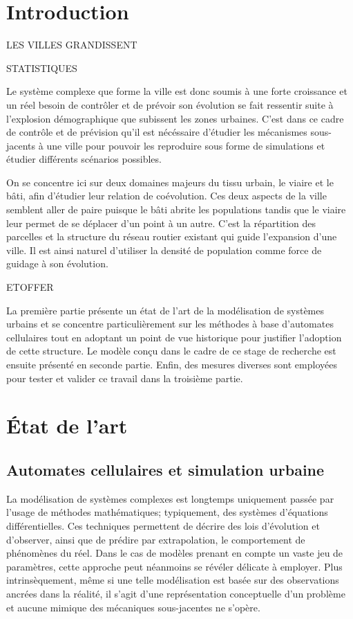 \documentclass[12pt]{article}
\begin{document}
\newpage

\section{Introduction}

LES VILLES GRANDISSENT

STATISTIQUES

Le système complexe que forme la ville est donc soumis à une forte
croissance et un réel besoin de contrôler et de prévoir son évolution
se fait ressentir suite à l'explosion démographique que subissent les
zones urbaines. C'est dans ce cadre de contrôle et de prévision qu'il
est nécéssaire d'étudier les mécanismes sous-jacents à une ville pour
pouvoir les reproduire sous forme de simulations et étudier différents
scénarios possibles.

On se concentre ici sur deux domaines majeurs du tissu urbain, le
viaire et le bâti, afin d'étudier leur relation de coévolution. Ces
deux aspects de la ville semblent aller de paire puisque le bâti
abrite les populations tandis que le viaire leur permet de se déplacer
d'un point à un autre. C'est la répartition des parcelles et la
structure du réseau routier existant qui guide l'expansion d'une
ville. Il est ainsi naturel d'utiliser la densité de population comme
force de guidage à son évolution.

ETOFFER

La première partie présente un état de l'art de la modélisation de
systèmes urbains et se concentre particulièrement sur les méthodes à
base d'automates cellulaires tout en adoptant un point de vue
historique pour justifier l'adoption de cette structure. Le modèle
conçu dans le cadre de ce stage de recherche est ensuite présenté en
seconde partie. Enfin, des mesures diverses sont employées pour tester
et valider ce travail dans la troisième partie.

\section{\'Etat de l'art}

\subsection{Automates cellulaires et simulation urbaine}

La modélisation de systèmes complexes est longtemps uniquement passée
par l'usage de méthodes mathématiques; typiquement, des systèmes
d'équations différentielles. Ces techniques permettent de décrire des
lois d'évolution et d'observer, ainsi que de prédire par
extrapolation, le comportement de phénomènes du réel. Dans le cas de
modèles prenant en compte un vaste jeu de paramètres, cette approche
peut néanmoins se révéler délicate à employer. Plus intrinsèquement,
même si une telle modélisation est basée sur des observations ancrées
dans la réalité, il s'agit d'une représentation conceptuelle d'un
problème et aucune mimique des mécaniques sous-jacentes ne s'opère.
\end{document}
